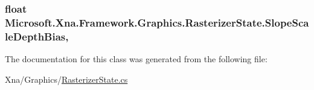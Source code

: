 \subsubsection[{Slope\+Scale\+Depth\+Bias}]{\setlength{\rightskip}{0pt plus 5cm}float Microsoft.\+Xna.\+Framework.\+Graphics.\+Rasterizer\+State.\+Slope\+Scale\+Depth\+Bias\hspace{0.3cm}{\ttfamily [get]}, {\ttfamily [set]}}\label{class_microsoft_1_1_xna_1_1_framework_1_1_graphics_1_1_rasterizer_state_a28262155003d4367c518a3c7043bd423}


The documentation for this class was generated from the following file\+:\begin{DoxyCompactItemize}
\item 
Xna/\+Graphics/\hyperlink{_rasterizer_state_8cs}{Rasterizer\+State.\+cs}\end{DoxyCompactItemize}

